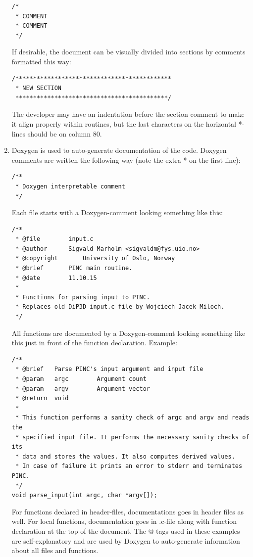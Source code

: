 \documentclass[10pt,a4paper]{article}
\begin{document}
\begin{enumerate}
	\begin{lstlisting}
/*
 * COMMENT
 * COMMENT
 */
	 \end{lstlisting}
	If desirable, the document can be visually divided into sections by comments formatted this way:
	 \begin{lstlisting}
/********************************************
 * NEW SECTION
 *******************************************/
	 \end{lstlisting}
	 The developer may have an indentation before the section comment to make it align properly within routines, but the last characters on the horizontal *-lines should be on column 80.
	 \item Doxygen is used to auto-generate documentation of the code. Doxygen comments are written the following way (note the extra * on the first line):
	 \begin{lstlisting}
/**
 * Doxygen interpretable comment
 */
	 \end{lstlisting}
	 Each file starts with a Doxygen-comment looking something like this:
	 \begin{lstlisting}
/**
 * @file		input.c
 * @author		Sigvald Marholm <sigvaldm@fys.uio.no>
 * @copyright		University of Oslo, Norway
 * @brief		PINC main routine.
 * @date		11.10.15
 *
 * Functions for parsing input to PINC.
 * Replaces old DiP3D input.c file by Wojciech Jacek Miloch.
 */	 	
	 \end{lstlisting}
	 All functions are documented by a Doxygen-comment looking something like this just in front of the function declaration. Example: 
	 \begin{lstlisting}
/**
 * @brief	Parse PINC's input argument and input file
 * @param	argc		Argument count
 * @param	argv		Argument vector
 * @return	void 
 *
 * This function performs a sanity check of argc and argv and reads the
 * specified input file. It performs the necessary sanity checks of its
 * data and stores the values. It also computes derived values.
 * In case of failure it prints an error to stderr and terminates PINC.
 */
void parse_input(int argc, char *argv[]);
	\end{lstlisting}
	For functions declared in header-files, documentations goes in header files as well. For local functions, documentation goes in .c-file along with function declaration at the top of the document. The @-tags used in these examples are self-explanatory and are used by Doxygen to auto-generate information about all files and functions.
\end{enumerate}
\end{document}
